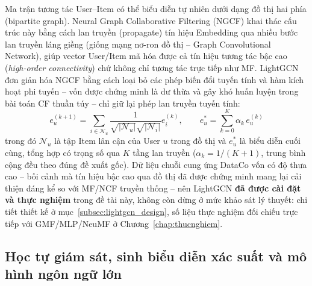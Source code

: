 Ma trận tương tác User--Item có thể biểu diễn tự nhiên dưới dạng đồ thị hai phía (bipartite graph). Neural Graph Collaborative Filtering (NGCF) \parencite{wang2019ngcf} khai thác cấu trúc này bằng cách lan truyền (propagate) tín hiệu Embedding qua nhiều bước lan truyền láng giềng (giống mạng nơ-ron đồ thị -- Graph Convolutional Network), giúp vector User/Item mã hóa được cả tín hiệu tương tác bậc cao (\textit{high-order connectivity}) chứ không chỉ tương tác trực tiếp như MF. LightGCN \parencite{he2020lightgcn} đơn giản hóa NGCF bằng cách loại bỏ các phép biến đổi tuyến tính và hàm kích hoạt phi tuyến -- vốn được chứng minh là dư thừa và gây khó huấn luyện trong bài toán CF thuần túy -- chỉ giữ lại phép lan truyền tuyến tính:
\begin{equation}
    e_u^{(k+1)} = \sum_{i \in \mathcal{N}_u} \frac{1}{\sqrt{|\mathcal{N}_u|}\sqrt{|\mathcal{N}_i|}} e_i^{(k)}, \qquad
    e_u^{*} = \sum_{k=0}^{K} \alpha_k \, e_u^{(k)}
    \label{eq:lightgcn}
\end{equation}
trong đó $\mathcal{N}_u$ là tập Item lân cận của User $u$ trong đồ thị và $e_u^{*}$ là biểu diễn cuối cùng, tổng hợp có trọng số qua $K$ tầng lan truyền ($\alpha_k = 1/(K{+}1)$, trung bình cộng đều theo đúng đề xuất gốc). Dữ liệu chuỗi cung ứng DataCo vốn có độ thưa cao -- bối cảnh mà tín hiệu bậc cao qua đồ thị đã được chứng minh mang lại cải thiện đáng kể so với MF/NCF truyền thống -- nên LightGCN \textbf{đã được cài đặt và thực nghiệm} trong đề tài này, không còn dừng ở mức khảo sát lý thuyết: chi tiết thiết kế ở mục~\ref{subsec:lightgcn_design}, số liệu thực nghiệm đối chiếu trực tiếp với GMF/MLP/NeuMF ở Chương~\ref{chap:thucnghiem}.

\subsection{Học tự giám sát, sinh biểu diễn xác suất và mô hình ngôn ngữ lớn}
\label{subsec:ssl_llm}

